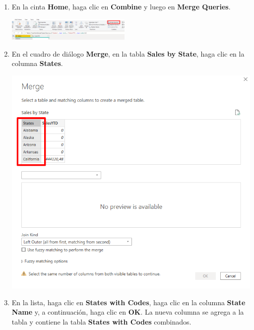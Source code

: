 \documentclass[12pt,letterpaper]{article}
\newcommand\tab[1][1cm]{\hspace*{#1}}
\begin{document}
\begin{enumerate}[\tab 1.]
\begin{center}
        \end{center}
        \item En la cinta \textbf{Home}, haga clic en \textbf{Combine} y luego en \textbf{Merge Queries}.
        \begin{center}
            \includegraphics[width=6cm]{./img/img70.png}
        \end{center}
        \item En el cuadro de diálogo \textbf{Merge}, en la tabla \textbf{Sales by State}, haga clic en la columna \textbf{States}.
        \begin{center}
            \includegraphics[width=13cm]{./img/img71.png}
        \end{center}
        \item En la lista, haga clic en \textbf{States with Codes}, haga clic en la columna \textbf{State Name} y, a continuación, haga clic en \textbf{OK}. La nueva columna se agrega a la tabla y contiene la tabla \textbf{States with Codes} combinados.
        \begin{center}

\end{center}
\end{enumerate}
\end{document}
